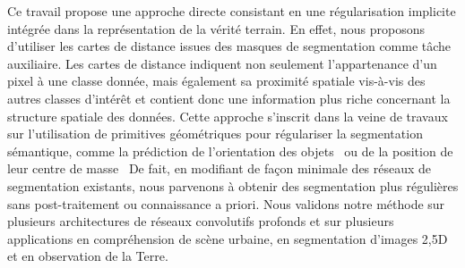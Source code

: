Ce travail propose une approche directe consistant en une régularisation implicite intégrée dans la représentation de la vérité terrain. En effet, nous proposons d'utiliser les cartes de distance issues des masques de segmentation comme tâche auxiliaire. Les cartes de distance indiquent non seulement l'appartenance d'un pixel à une classe donnée, mais également sa proximité spatiale vis-à-vis des autres classes d'intérêt et contient donc une information plus riche concernant la structure spatiale des données. Cette approche s'inscrit dans la veine de travaux sur l'utilisation de primitives géométriques pour régulariser la segmentation sémantique, comme la prédiction de l'orientation des objets~\cite{uhrig_pixel-level_2016} ou de la position de leur centre de masse~\cite{hayder_boundary-aware_2017}
De fait, en modifiant de façon minimale des réseaux de segmentation existants, nous parvenons à obtenir des segmentation plus régulières sans post-traitement ou connaissance a priori.
Nous validons notre méthode sur plusieurs architectures de réseaux convolutifs profonds et sur plusieurs applications en compréhension de scène urbaine, en segmentation d'images 2,5D et en observation de la Terre.

